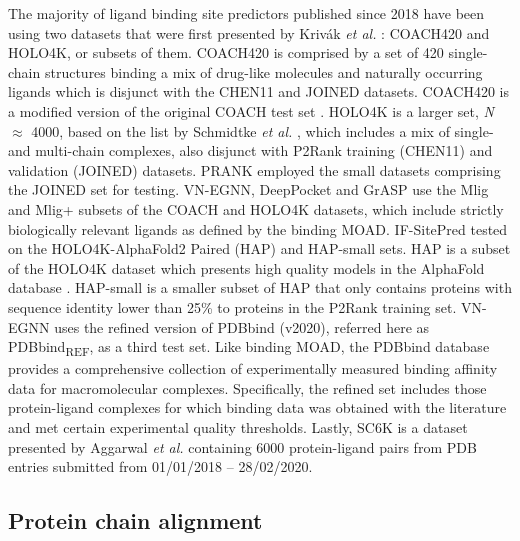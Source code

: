 The majority of ligand binding site predictors published since 2018 have been using two datasets that were first presented by Krivák \textit{et al.} \cite{KRIVAK_2018_P2RANK}: COACH420 and HOLO4K, or subsets of them. COACH420 is comprised by a set of 420 single-chain structures binding a mix of drug-like molecules and naturally occurring ligands which is disjunct with the CHEN11 and JOINED datasets. COACH420 is a modified version of the original COACH test set \cite{ROY_2012_COFACTOR, YANG_2013_COFACTOR}. HOLO4K is a larger set, \textit{N} $\approx$ 4000, based on the list by Schmidtke \textit{et al.} \cite{SCHMIDTKE_2010_BENCHMARK}, which includes a mix of single- and multi-chain complexes, also disjunct with P2Rank training (CHEN11) and validation (JOINED) datasets. PRANK employed the small datasets comprising the JOINED set for testing. VN-EGNN, DeepPocket and GrASP use the Mlig and Mlig+ subsets of the COACH and HOLO4K datasets, which include strictly biologically relevant ligands as defined by the binding MOAD. IF-SitePred tested on the HOLO4K-AlphaFold2 Paired (HAP) and HAP-small sets. HAP is a subset of the HOLO4K dataset which presents high quality models in the AlphaFold database \cite{VARADI_2022_ALPHAFOLDDB}. HAP-small is a smaller subset of HAP that only contains proteins with sequence identity lower than 25\% to proteins in the P2Rank training set. VN-EGNN uses the refined version of PDBbind (v2020), referred here as PDBbind\textsubscript{REF}, \cite{WANG_2004_PDBBIND, WANG_2005_PDBBIND, CHENG_2009_PDBBIND, LI_2014_PDBBIND, LIU_2015_PDBBIND, LIU_2017_PDBBIND} as a third test set. Like binding MOAD, the PDBbind database provides a comprehensive collection of experimentally measured binding affinity data for macromolecular complexes. Specifically, the refined set includes those protein-ligand complexes for which binding data was obtained with the literature and met certain experimental quality thresholds. Lastly, SC6K is a dataset presented by Aggarwal \textit{et al.} \cite{AGGARWAL_2022_DEEPPOCKET} containing 6000 protein-ligand pairs from PDB entries submitted from 01/01/2018 – 28/02/2020.

\subsection{Protein chain alignment}

